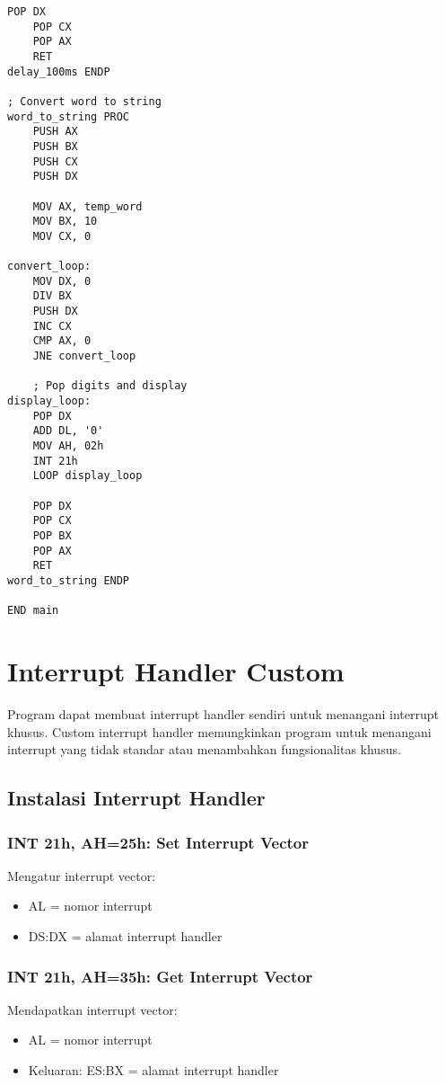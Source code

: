 \documentclass[../main.tex]{subfiles}
\begin{document}
\begin{lstlisting}[language={[x86masm]Assembler}, caption=Program Timer dan Delay, label={lst:timer-demo}]
    POP DX
    POP CX
    POP AX
    RET
delay_100ms ENDP

; Convert word to string
word_to_string PROC
    PUSH AX
    PUSH BX
    PUSH CX
    PUSH DX
    
    MOV AX, temp_word
    MOV BX, 10
    MOV CX, 0
    
convert_loop:
    MOV DX, 0
    DIV BX
    PUSH DX
    INC CX
    CMP AX, 0
    JNE convert_loop
    
    ; Pop digits and display
display_loop:
    POP DX
    ADD DL, '0'
    MOV AH, 02h
    INT 21h
    LOOP display_loop
    
    POP DX
    POP CX
    POP BX
    POP AX
    RET
word_to_string ENDP

END main
            \end{lstlisting}

    \section{Interrupt Handler Custom}
        Program dapat membuat interrupt handler sendiri untuk menangani interrupt khusus. Custom interrupt handler memungkinkan program untuk menangani interrupt yang tidak standar atau menambahkan fungsionalitas khusus.

        \subsection{Instalasi Interrupt Handler}
            \subsubsection{INT 21h, AH=25h: Set Interrupt Vector}
                Mengatur interrupt vector:
                \begin{itemize}
                    \item AL = nomor interrupt
                    \item DS:DX = alamat interrupt handler
                \end{itemize}

            \subsubsection{INT 21h, AH=35h: Get Interrupt Vector}
                Mendapatkan interrupt vector:
                \begin{itemize}
                    \item AL = nomor interrupt
                    \item Keluaran: ES:BX = alamat interrupt handler
                \end{itemize}
\end{document}
